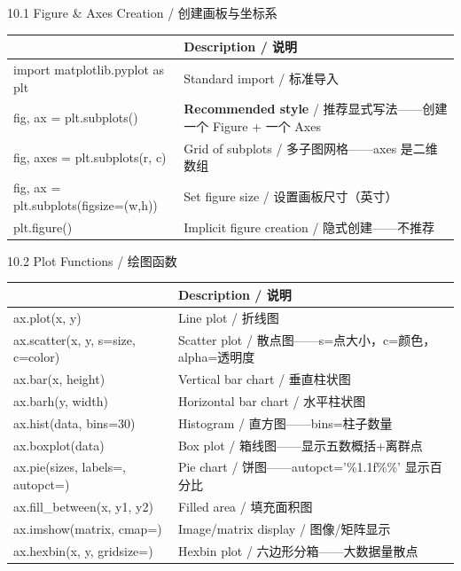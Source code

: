 \documentclass[11pt,a4paper]{report}
\begin{document}
\begin{cmdsection}{10.1  Figure \& Axes Creation / 创建画板与坐标系}
\normalsize\renewcommand{\arraystretch}{1.4}
\centering
\begin{tabularx}{\textwidth}{@{}>{\ttfamily}l>{\raggedright\arraybackslash}X@{}}
\toprule
\multicolumn{1}{@{}l}{\textbf{Syntax}} & \textbf{Description / 说明} \\ \midrule
import matplotlib.pyplot as plt & Standard import / 标准导入 \\
fig, ax = plt.subplots()        & \textbf{Recommended style} / 推荐显式写法——创建一个 Figure + 一个 Axes \\
fig, axes = plt.subplots(r, c)  & Grid of subplots / 多子图网格——axes 是二维数组 \\
fig, ax = plt.subplots(figsize=(w,h)) & Set figure size / 设置画板尺寸（英寸） \\
plt.figure()                    & Implicit figure creation / 隐式创建——不推荐 \\
\bottomrule
\end{tabularx}
\end{cmdsection}

\begin{cmdsection}{10.2  Plot Functions / 绘图函数}
\normalsize\renewcommand{\arraystretch}{1.4}
\centering
\begin{tabularx}{\textwidth}{@{}>{\ttfamily}l>{\raggedright\arraybackslash}X@{}}
\toprule
\multicolumn{1}{@{}l}{\textbf{Syntax}} & \textbf{Description / 说明} \\ \midrule
ax.plot(x, y)                   & Line plot / 折线图 \\
ax.scatter(x, y, s=size, c=color) & Scatter plot / 散点图——s=点大小，c=颜色，alpha=透明度 \\
ax.bar(x, height)               & Vertical bar chart / 垂直柱状图 \\
ax.barh(y, width)               & Horizontal bar chart / 水平柱状图 \\
ax.hist(data, bins=30)          & Histogram / 直方图——bins=柱子数量 \\
ax.boxplot(data)                & Box plot / 箱线图——显示五数概括+离群点 \\
ax.pie(sizes, labels=, autopct=) & Pie chart / 饼图——autopct='\%1.1f\%\%' 显示百分比 \\
ax.fill\_between(x, y1, y2)     & Filled area / 填充面积图 \\
ax.imshow(matrix, cmap=)        & Image/matrix display / 图像/矩阵显示 \\
ax.hexbin(x, y, gridsize=)      & Hexbin plot / 六边形分箱——大数据量散点 \\
\bottomrule
\end{tabularx}
\end{cmdsection}
\end{document}
